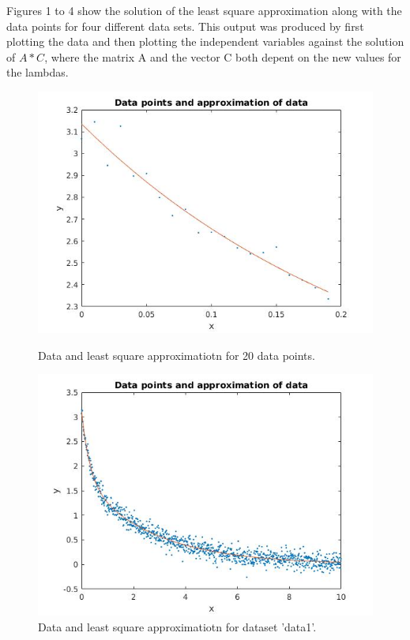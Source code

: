 \documentclass[12pt]{article}
\begin{document}
Figures 1 to 4 show the solution of the least square approximation along with the data points for four different data sets. This output was produced by first plotting the data and then plotting the independent variables against the solution of $A * C$, where the matrix A and the vector C both depent on the new values for the lambdas.
\begin{figure}[H]
\parbox[t]{0.4\textwidth}{
	\includegraphics[width=\linewidth,natwidth=610,natheight=642]{ex1_testdata.jpg}
	\caption{Data and least square approximatiotn for 20 data points.}
}
\hfill
\parbox[t]{0.4\textwidth}{
	\includegraphics[width=\linewidth,natwidth=610,natheight=642]{ex1_data1.jpg}
	\caption {Data and least square approximatiotn for dataset 'data1'.}
}
\end{figure}
\end{document}
